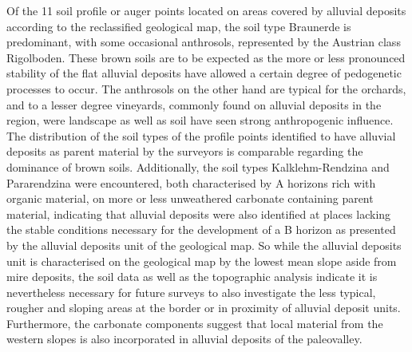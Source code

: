 \documentclass[preprint,12pt,authoryear]{elsarticle}
\begin{document}
Of the 11 soil profile or auger points located on areas covered by alluvial deposits according to the reclassified geological map, the soil type Braunerde is predominant, with some occasional anthrosols, represented by the Austrian class Rigolboden. These brown soils are to be expected as the more or less pronounced stability of the flat alluvial deposits have allowed a certain degree of pedogenetic processes to occur. The anthrosols on the other hand are typical for the orchards, and to a lesser degree vineyards, commonly found on alluvial deposits in the region, were landscape as well as soil have seen strong anthropogenic influence. The distribution of the soil types of the profile points identified to have alluvial deposits as parent material by the surveyors is comparable regarding the dominance of brown soils. Additionally, the soil types Kalklehm-Rendzina and Pararendzina were encountered, both characterised by A horizons rich with organic material, on more or less unweathered carbonate containing parent material, indicating that alluvial deposits were also identified at places lacking the stable conditions necessary for the development of a B horizon as presented by the alluvial deposits unit of the geological map. So while the alluvial deposits unit is characterised on the geological map by the lowest mean slope aside from mire deposits, the soil data as well as the topographic analysis indicate it is nevertheless necessary for future surveys to also investigate the less typical, rougher and sloping areas at the border or in proximity of alluvial deposit units. Furthermore, the carbonate components suggest that local material from  the western slopes is also incorporated in alluvial deposits of the paleovalley.
\end{document}

